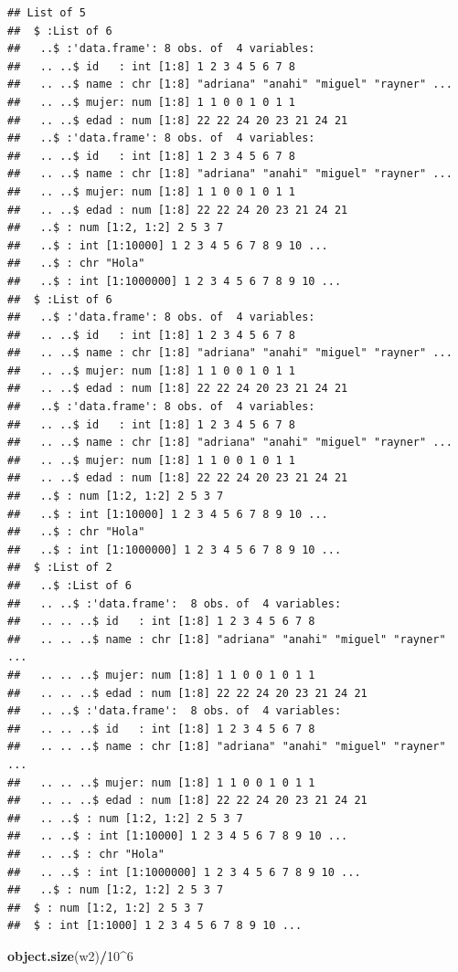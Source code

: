 \documentclass[
]{book}
\newenvironment{Shaded}{\begin{snugshade}}{\end{snugshade}}
\newcommand{\DecValTok}[1]{\textcolor[rgb]{0.00,0.00,0.81}{#1}}
\newcommand{\KeywordTok}[1]{\textcolor[rgb]{0.13,0.29,0.53}{\textbf{#1}}}
\newcommand{\NormalTok}[1]{#1}
\newcommand{\OperatorTok}[1]{\textcolor[rgb]{0.81,0.36,0.00}{\textbf{#1}}}
\begin{document}
\begin{verbatim}
## List of 5
##  $ :List of 6
##   ..$ :'data.frame': 8 obs. of  4 variables:
##   .. ..$ id   : int [1:8] 1 2 3 4 5 6 7 8
##   .. ..$ name : chr [1:8] "adriana" "anahi" "miguel" "rayner" ...
##   .. ..$ mujer: num [1:8] 1 1 0 0 1 0 1 1
##   .. ..$ edad : num [1:8] 22 22 24 20 23 21 24 21
##   ..$ :'data.frame': 8 obs. of  4 variables:
##   .. ..$ id   : int [1:8] 1 2 3 4 5 6 7 8
##   .. ..$ name : chr [1:8] "adriana" "anahi" "miguel" "rayner" ...
##   .. ..$ mujer: num [1:8] 1 1 0 0 1 0 1 1
##   .. ..$ edad : num [1:8] 22 22 24 20 23 21 24 21
##   ..$ : num [1:2, 1:2] 2 5 3 7
##   ..$ : int [1:10000] 1 2 3 4 5 6 7 8 9 10 ...
##   ..$ : chr "Hola"
##   ..$ : int [1:1000000] 1 2 3 4 5 6 7 8 9 10 ...
##  $ :List of 6
##   ..$ :'data.frame': 8 obs. of  4 variables:
##   .. ..$ id   : int [1:8] 1 2 3 4 5 6 7 8
##   .. ..$ name : chr [1:8] "adriana" "anahi" "miguel" "rayner" ...
##   .. ..$ mujer: num [1:8] 1 1 0 0 1 0 1 1
##   .. ..$ edad : num [1:8] 22 22 24 20 23 21 24 21
##   ..$ :'data.frame': 8 obs. of  4 variables:
##   .. ..$ id   : int [1:8] 1 2 3 4 5 6 7 8
##   .. ..$ name : chr [1:8] "adriana" "anahi" "miguel" "rayner" ...
##   .. ..$ mujer: num [1:8] 1 1 0 0 1 0 1 1
##   .. ..$ edad : num [1:8] 22 22 24 20 23 21 24 21
##   ..$ : num [1:2, 1:2] 2 5 3 7
##   ..$ : int [1:10000] 1 2 3 4 5 6 7 8 9 10 ...
##   ..$ : chr "Hola"
##   ..$ : int [1:1000000] 1 2 3 4 5 6 7 8 9 10 ...
##  $ :List of 2
##   ..$ :List of 6
##   .. ..$ :'data.frame':  8 obs. of  4 variables:
##   .. .. ..$ id   : int [1:8] 1 2 3 4 5 6 7 8
##   .. .. ..$ name : chr [1:8] "adriana" "anahi" "miguel" "rayner" ...
##   .. .. ..$ mujer: num [1:8] 1 1 0 0 1 0 1 1
##   .. .. ..$ edad : num [1:8] 22 22 24 20 23 21 24 21
##   .. ..$ :'data.frame':  8 obs. of  4 variables:
##   .. .. ..$ id   : int [1:8] 1 2 3 4 5 6 7 8
##   .. .. ..$ name : chr [1:8] "adriana" "anahi" "miguel" "rayner" ...
##   .. .. ..$ mujer: num [1:8] 1 1 0 0 1 0 1 1
##   .. .. ..$ edad : num [1:8] 22 22 24 20 23 21 24 21
##   .. ..$ : num [1:2, 1:2] 2 5 3 7
##   .. ..$ : int [1:10000] 1 2 3 4 5 6 7 8 9 10 ...
##   .. ..$ : chr "Hola"
##   .. ..$ : int [1:1000000] 1 2 3 4 5 6 7 8 9 10 ...
##   ..$ : num [1:2, 1:2] 2 5 3 7
##  $ : num [1:2, 1:2] 2 5 3 7
##  $ : int [1:1000] 1 2 3 4 5 6 7 8 9 10 ...
\end{verbatim}

\begin{Shaded}
\begin{Highlighting}[]
\KeywordTok{object.size}\NormalTok{(w2)}\OperatorTok{/}\DecValTok{10}\OperatorTok{^}\DecValTok{6}
\end{Highlighting}
\end{Shaded}
\end{document}

